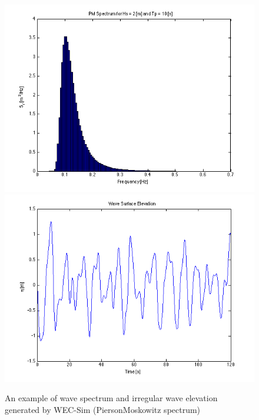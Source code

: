 \noindent 
\begin{figure}[h]
\noindent \begin{centering}
\includegraphics[scale=0.42]{theoryManual/Figures/Spectrum}\includegraphics[scale=0.42]{theoryManual/Figures/WaveElevation}
\par\end{centering}
\noindent \centering{}\protect\caption{An example of wave spectrum and irregular wave elevation generated by WEC-Sim (Pierson\textendash Moskowitz spectrum)\label{fig:An-example-of PM Spectrum}}
\end{figure}

